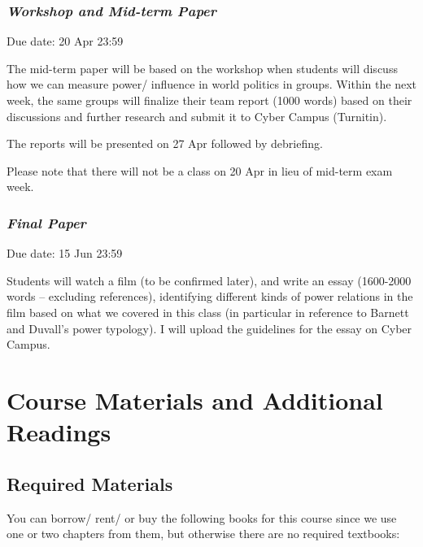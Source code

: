 \documentclass[
  letterpaper,
  DIV=11,
  numbers=noendperiod]{scrartcl}
\begin{document}
\hypertarget{sec-workshop}{%
\subsubsection{\texorpdfstring{\textbf{\emph{Workshop and Mid-term
Paper}}}{Workshop and Mid-term Paper}}\label{sec-workshop}}

Due date: 20 Apr 23:59

The mid-term paper will be based on the workshop when students will
discuss how we can measure power/ influence in world politics in groups.
Within the next week, the same groups will finalize their team report
(1000 words) based on their discussions and further research and submit
it to Cyber Campus (Turnitin).

The reports will be presented on 27 Apr followed by debriefing.

Please note that there will not be a class on 20 Apr in lieu of mid-term
exam week.

\hypertarget{sec-final}{%
\subsubsection{\texorpdfstring{\textbf{\emph{Final
Paper}}}{Final Paper}}\label{sec-final}}

Due date: 15 Jun 23:59

Students will watch a film (to be confirmed later), and write an essay
(1600-2000 words -- excluding references), identifying different kinds
of power relations in the film based on what we covered in this class
(in particular in reference to Barnett and Duvall's power typology). I
will upload the guidelines for the essay on Cyber Campus.

\hypertarget{course-materials-and-additional-readings}{%
\section{\texorpdfstring{{\textbf{Course Materials and Additional
Readings}}}{Course Materials and Additional Readings}}\label{course-materials-and-additional-readings}}

\hypertarget{required-materials}{%
\subsection{Required Materials}\label{required-materials}}

You can borrow/ rent/ or buy the following books for this course since
we use one or two chapters from them, but otherwise there are no
required textbooks:
\end{document}
